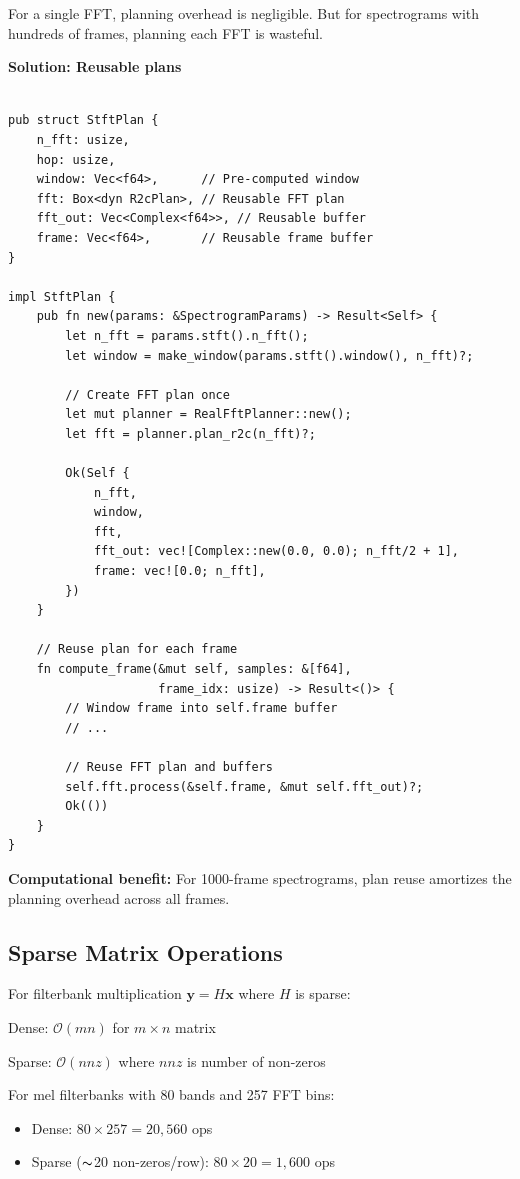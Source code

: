 For a single FFT, planning overhead is negligible. But for
spectrograms with hundreds of frames, planning each FFT is wasteful.

\textbf{Solution: Reusable plans}

\begin{lstlisting}[caption={Reusable STFT plan with cached FFT and window}]

pub struct StftPlan {
    n_fft: usize,
    hop: usize,
    window: Vec<f64>,      // Pre-computed window
    fft: Box<dyn R2cPlan>, // Reusable FFT plan
    fft_out: Vec<Complex<f64>>, // Reusable buffer
    frame: Vec<f64>,       // Reusable frame buffer
}

impl StftPlan {
    pub fn new(params: &SpectrogramParams) -> Result<Self> {
        let n_fft = params.stft().n_fft();
        let window = make_window(params.stft().window(), n_fft)?;

        // Create FFT plan once
        let mut planner = RealFftPlanner::new();
        let fft = planner.plan_r2c(n_fft)?;

        Ok(Self {
            n_fft,
            window,
            fft,
            fft_out: vec![Complex::new(0.0, 0.0); n_fft/2 + 1],
            frame: vec![0.0; n_fft],
        })
    }

    // Reuse plan for each frame
    fn compute_frame(&mut self, samples: &[f64],
                     frame_idx: usize) -> Result<()> {
        // Window frame into self.frame buffer
        // ...

        // Reuse FFT plan and buffers
        self.fft.process(&self.frame, &mut self.fft_out)?;
        Ok(())
    }
}
\end{lstlisting}

\textbf{Computational benefit:} For 1000-frame spectrograms, plan reuse
amortizes the planning overhead across all frames.

\subsection{Sparse Matrix Operations}

For filterbank multiplication $\mathbf{y} = H\mathbf{x}$ where $H$ is sparse:

Dense: $\mathcal{O}(mn)$ for $m \times n$ matrix

Sparse: $\mathcal{O}(nnz)$ where $nnz$ is number of non-zeros

For mel filterbanks with 80 bands and 257 FFT bins:
\begin{itemize}
  \item Dense: $80 \times 257 = 20{,}560$ ops
  \item Sparse ($\thicksim$20 non-zeros/row): $80 \times 20 = 1{,}600$ ops
\end{itemize}

